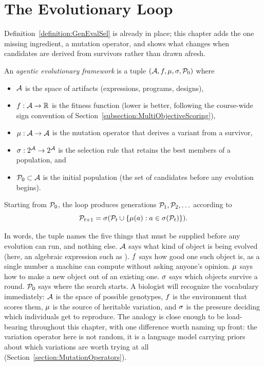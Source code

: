 \section{The Evolutionary Loop}
\label{section:EvolutionaryLoop}

Definition~\ref{definition:GenEvalSel} is already in place; this chapter adds the one missing ingredient, a mutation operator, and shows what changes when candidates are derived from survivors rather than drawn afresh.

\begin{definition}
\label{definition:EvolutionaryLoop}
An \emph{agentic evolutionary framework} is a tuple $(\mathcal{A}, f, \mu, \sigma, \mathcal{P}_0)$ where
\begin{itemize}
\item $\mathcal{A}$ is the space of artifacts (expressions, programs, designs),
\item $f : \mathcal{A} \to \mathbb{R}$ is the fitness function (lower is better, following the course-wide sign convention of Section~\ref{subsection:MultiObjectiveScoring}),
\item $\mu : \mathcal{A} \to \mathcal{A}$ is the mutation operator that derives a variant from a survivor,
\item $\sigma : 2^{\mathcal{A}} \to 2^{\mathcal{A}}$ is the selection rule that retains the best members of a population, and
\item $\mathcal{P}_0 \subset \mathcal{A}$ is the initial population (the set of candidates before any evolution begins).
\end{itemize}
Starting from $\mathcal{P}_0$, the loop produces generations $\mathcal{P}_1, \mathcal{P}_2, \ldots$ according to
\begin{equation}
\mathcal{P}_{t+1} = \sigma(\mathcal{P}_t \cup \{\mu(a) : a \in \sigma(\mathcal{P}_t)\}) .
\label{equation:EvolutionaryLoop}
\end{equation}
\end{definition}

In words, the tuple names the five things that must be supplied before any evolution can run, and nothing else.
$\mathcal{A}$ says what kind of object is being evolved (here, an algebraic expression such as ).
$f$ says how good one such object is, as a single number a machine can compute without asking anyone's opinion.
$\mu$ says how to make a new object out of an existing one.
$\sigma$ says which objects survive a round.
$\mathcal{P}_0$ says where the search starts.
A biologist will recognize the vocabulary immediately: $\mathcal{A}$ is the space of possible genotypes, $f$ is the environment that scores them, $\mu$ is the source of heritable variation, and $\sigma$ is the pressure deciding which individuals get to reproduce.
The analogy is close enough to be load-bearing throughout this chapter, with one difference worth naming up front: the variation operator here is not random, it is a language model carrying priors about which variations are worth trying at all (Section~\ref{section:MutationOperators}).

